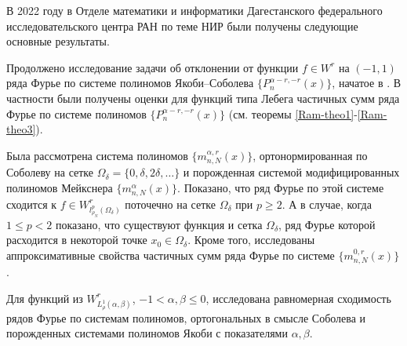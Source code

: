 \Conclusion

В 2022 году в Отделе математики и информатики Дагестанского федерального иссле\-довательского центра РАН по теме НИР были получены следующие основные результаты.





Продолжено исследование задачи об отклонении от функции $f\in W^r$ на $(-1,1)$ ряда Фурье по системе полиномов Якоби--Соболева $\{P_n^{\alpha-r,-r}(x)\}$, начатое в \cite{Ram-SharMN}. В частности были получены оценки для функций типа Лебега частичных сумм ряда Фурье по системе полиномов $\{P_n^{\alpha-r,-r}(x)\}$ (см. теоремы \ref{Ram-theo1}-\ref{Ram-theo3}).

Была рассмотрена система полиномов $\{m_{n,N}^{\alpha,r}(x)\}$, ортонормированная по Соболеву на сетке $\Omega_\delta=\{0, \delta, 2\delta, \ldots\}$ и порожденная системой модифицированных полиномов Мейкснера $\{m_{n,N}^{\alpha}(x)\}$. Показано, что ряд Фурье по этой системе сходится к $f\in W^r_{l^p_{\rho_N}(\Omega_\delta)}$ поточечно на сетке $\Omega_\delta$ при $p\ge2$. А в случае, когда $1\le p<2$ показано, что существуют функция и сетка $\Omega_\delta$, ряд Фурье которой расходится в некоторой точке $x_0\in\Omega_\delta$. Кроме того, исследованы аппроксимативные свойства частичных сумм ряда Фурье по системе $\{m_{n,N}^{0,r}(x)\}$.


Для функций из $W^r_{L^1_\rho(\alpha,\beta)}$, $-1 <\alpha, \beta  \le 0$, исследована равномерная сходимость рядов Фурье по системам полиномов, ортогональных в смысле Соболева и порожденных системами полиномов Якоби с показателями $\alpha, \beta$.

